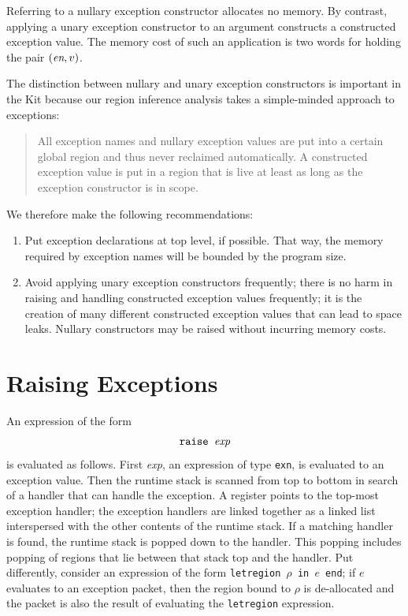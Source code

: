 \documentclass[12pt]{book}
\begin{document}
Referring to a nullary exception constructor allocates no memory. By
contrast, applying a unary exception constructor to an argument
constructs a constructed exception value. The memory cost of such an
application is two words for holding the pair $(\hbox{\it en}, v)$.

The distinction between nullary and unary exception constructors is
important in the Kit because our region inference analysis takes a
simple-minded approach to exceptions:
\begin{quote}
  All exception names and nullary exception values are put into a
  certain
  global region and thus never reclaimed automatically. A constructed
  exception value is put in a region that is live at least as long as
  the exception constructor is in scope.
\end{quote}
We therefore make the following recommendations:
\begin{enumerate}
\item Put exception declarations at top level, if possible.  That way,
  the memory required by exception names will be bounded by the
  program size.
\item Avoid applying unary exception constructors frequently; there is
  no harm in raising and handling constructed exception values
  frequently; it is the creation of many different constructed
  exception values that can lead to space leaks. Nullary constructors
  may be raised without incurring memory costs.
\end{enumerate}

\section{Raising Exceptions}
An expression of the form 
%
$$\hbox{\tt raise {\it exp}}$$
is evaluated as follows. First {\it exp},
an expression of type {\tt exn}, is evaluated to an exception value.
Then the runtime
%
stack is scanned from top to bottom in search of a handler that
can handle the exception. A register points to the top-most exception
handler; the exception handlers are linked together as a linked list
interspersed with the other contents of the runtime stack.  If a
matching handler is found, the runtime stack is popped down to the
handler. This popping includes popping of regions that lie between
that stack top and the handler. Put differently, consider an
expression of the form
%
{\tt letregion $\rho$ in $e$ end}; if $e$ evaluates to an exception
packet, then the region bound to $\rho$ is de-allocated and the packet
is also the result of evaluating the \texttt{letregion} expression.
\end{document}
